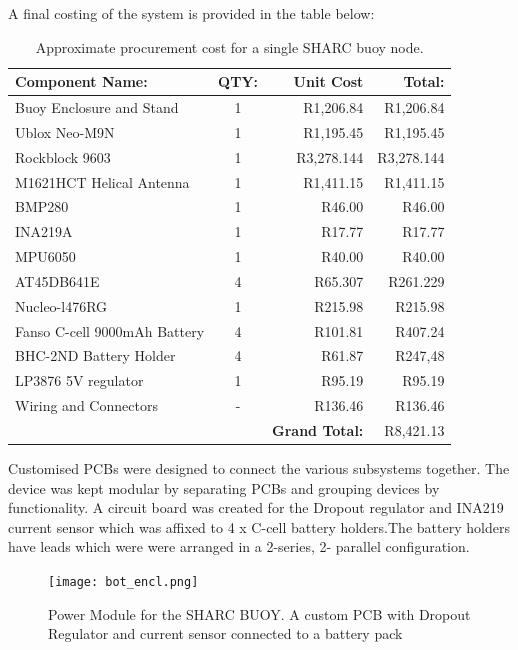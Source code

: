 A final costing of the system is provided in the table below:
\begin{table}[H]
	\centering
	\caption{Approximate procurement cost for a single SHARC buoy node.}
	\begin{tabular}{l c r r}
		\hline \hline
		\textbf{Component Name:} & \textbf{QTY:} & \textbf{Unit Cost} & \textbf{Total:}  \\
		\hline \hline
		Buoy Enclosure and Stand  & 1 & R1,206.84 & R1,206.84 \\
		Ublox Neo-M9N & 1 &  R1,195.45 &R1,195.45\\
		Rockblock 9603 & 1 & R3,278.144 & R3,278.144 \\
		M1621HCT Helical Antenna & 1 & R1,411.15 & R1,411.15 \\
		BMP280 & 1 & R46.00 & R46.00 \\
		INA219A & 1 & R17.77 & R17.77 \\
		MPU6050 & 1 & R40.00 & R40.00 \\
		AT45DB641E & 4 & R65.307 & R261.229 \\
		Nucleo-l476RG & 1 & R215.98 & R215.98 \\
		Fanso C-cell 9000mAh Battery & 4 & R101.81 & R407.24 \\
		BHC-2ND Battery Holder & 4 & R61.87 & R247,48 \\
		LP3876 5V regulator & 1 & R95.19 & R95.19 \\
		Wiring and Connectors & - & R136.46 & R136.46 \\
		\hline 
		\hline
		& & \textbf{ Grand Total: } & R8,421.13\\ 
		\hline \hline
	\end{tabular}
	\label{tab:total_cost}
\end{table}

Customised PCBs were designed to connect the various subsystems together. The device was kept modular by separating PCBs and grouping devices by functionality. A circuit board was created for the Dropout regulator and INA219 current sensor which was affixed to 4 x C-cell battery holders.The battery holders have leads which were were arranged in a 2-series, 2- parallel configuration.

\begin{figure}[H]
	\centering
	\texttt{[image: bot\_encl.png]}
	\caption{Power Module for the SHARC BUOY. A custom PCB with Dropout Regulator and current sensor connected to a battery pack}
	\label{fig:bot_elec}
\end{figure}

